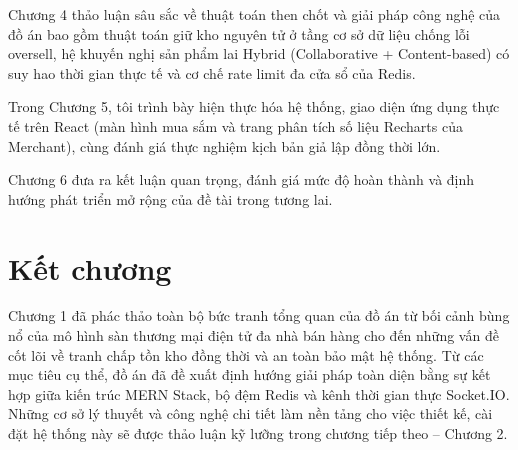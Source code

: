 \documentclass[../DoAn.tex]{subfiles}
\begin{document}
Chương 4 thảo luận sâu sắc về thuật toán then chốt và giải pháp công nghệ của đồ án bao gồm thuật toán giữ kho nguyên tử ở tầng cơ sở dữ liệu chống lỗi oversell, hệ khuyến nghị sản phẩm lai Hybrid (Collaborative + Content-based) có suy hao thời gian thực tế và cơ chế rate limit đa cửa sổ của Redis.

Trong Chương 5, tôi trình bày hiện thực hóa hệ thống, giao diện ứng dụng thực tế trên React (màn hình mua sắm và trang phân tích số liệu Recharts của Merchant), cùng đánh giá thực nghiệm kịch bản giả lập đồng thời lớn.

Chương 6 đưa ra kết luận quan trọng, đánh giá mức độ hoàn thành và định hướng phát triển mở rộng của đề tài trong tương lai.

\section*{Kết chương}
Chương 1 đã phác thảo toàn bộ bức tranh tổng quan của đồ án từ bối cảnh bùng nổ của mô hình sàn thương mại điện tử đa nhà bán hàng cho đến những vấn đề cốt lõi về tranh chấp tồn kho đồng thời và an toàn bảo mật hệ thống. Từ các mục tiêu cụ thể, đồ án đã đề xuất định hướng giải pháp toàn diện bằng sự kết hợp giữa kiến trúc MERN Stack, bộ đệm Redis và kênh thời gian thực Socket.IO. Những cơ sở lý thuyết và công nghệ chi tiết làm nền tảng cho việc thiết kế, cài đặt hệ thống này sẽ được thảo luận kỹ lưỡng trong chương tiếp theo – Chương 2.
\end{document}
